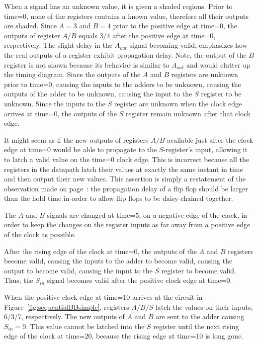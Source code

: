 When a signal has an unknown value, it is given a shaded regions.  Prior to
time=0, none of the registers contains a known value, therefore all
their outputs are shaded.  Since $A=3$ and $B=4$ prior to the
positive edge at time=0, the outputs of register $A/B$ equals 3/4
after the positive edge at time=0, respectively. The slight delay
in the $A_{out}$ signal becoming valid, emphasizes how the
real outputs of a register exhibit propagation delay. Note, the output of the
$B$ register is not shown because its behavior is similar to $A_{out}$ and
would clutter up the timing diagram.  Since the outputs of the $A$ and $B$
registers are unknown prior to time=0, causing the
inputs to the adders to be unknown, causing the outputs of the
adder to be unknown, causing the input to the $S$ register to be
unknown.  Since the inputs to the $S$
register are unknown when the clock edge arrives at time=0, the outputs of the
$S$ register remain unknown after that clock edge.

It might seem as if the new outputs of registers $A/B$ available
just after the clock edge at time=0 would be able to propagate
to the $S$-register's input, allowing it to latch a valid value
on the time=0 clock edge.  This is incorrect because all the
registers in the datapath latch their values at exactly the same
instant in time and then output their new values.  This assertion
is simply a restatement of the observation made on
page~\pageref{page:FFdelay}: the propagation delay of a flip flop
should be larger than the hold time in order to allow flip flops
to be daisy-chained together.

The $A$ and $B$ signals are changed at time=5, on a negative edge
of the clock, in order to keep the changes on the register inputs
as far away from a positive edge of the clock as possible.

After the rising edge of the clock at time=0, the outputs of the
$A$ and $B$ registers become valid, causing the inputs to the adder
to become valid, causing the output to become valid, causing the
input to the $S$ register to become valid.  Thus, the $S_{in}$
signal becomes valid after the positive clock edge at time=0.

When the positive clock edge at time=10 arrives at the circuit in
Figure~\ref{fig:sequentialBBsimple}, registers $A/B/S$ latch the values on their
inputs, 6/3/7, respectively.  The new outputs of $A$ and $B$ are
sent to the adder causing $S_{in} = 9$.  This value cannot be
latched into the $S$ register until the next rising edge of the
clock at time=20, because the rising edge at time=10 is long gone.

